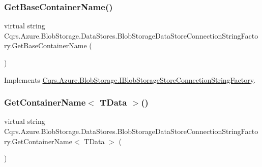 \subsubsection{\texorpdfstring{Get\+Base\+Container\+Name()}{GetBaseContainerName()}}
{\footnotesize\ttfamily virtual string Cqrs.\+Azure.\+Blob\+Storage.\+Data\+Stores.\+Blob\+Storage\+Data\+Store\+Connection\+String\+Factory.\+Get\+Base\+Container\+Name (\begin{DoxyParamCaption}{ }\end{DoxyParamCaption})\hspace{0.3cm}{\ttfamily [virtual]}}



Implements \hyperlink{interfaceCqrs_1_1Azure_1_1BlobStorage_1_1IBlobStorageStoreConnectionStringFactory_a57145e68e3bda84bc610fa61226a850c}{Cqrs.\+Azure.\+Blob\+Storage.\+I\+Blob\+Storage\+Store\+Connection\+String\+Factory}.

\mbox{\label{classCqrs_1_1Azure_1_1BlobStorage_1_1DataStores_1_1BlobStorageDataStoreConnectionStringFactory_a20374b5e2e77a593da164d3eb42b2a0a}} 
\subsubsection{\texorpdfstring{Get\+Container\+Name$<$ T\+Data $>$()}{GetContainerName< TData >()}}
{\footnotesize\ttfamily virtual string Cqrs.\+Azure.\+Blob\+Storage.\+Data\+Stores.\+Blob\+Storage\+Data\+Store\+Connection\+String\+Factory.\+Get\+Container\+Name$<$ T\+Data $>$ (\begin{DoxyParamCaption}{ }\end{DoxyParamCaption})\hspace{0.3cm}{\ttfamily [virtual]}}




